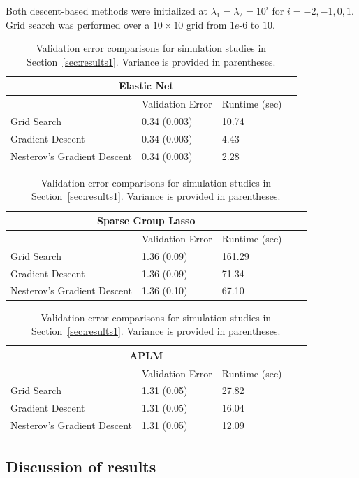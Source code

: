 \documentclass[12pt,letterpaper]{article}
\begin{document}
Both descent-based methods were initialized at $\lambda_1 = \lambda_2 = 10^i$ for $i=-2, -1, 0, 1$. Grid search was performed over a $10 \times 10$ grid from $1e\text{-}6$ to $10$.


\begin{table} 
\begin{center}

\begin{tabular}{| l | l | l | l | }
\hline
\multicolumn{3}{|c|}{Elastic Net}\\
\hline
 & Validation Error & Runtime (sec) \\
\hline
Grid Search & 0.34 (0.003) & 10.74\\
\hline
Gradient Descent & 0.34 (0.003) & 4.43 \\
\hline
Nesterov's Gradient Descent & 0.34 (0.003) & 2.28 \\
\hline
\end{tabular}


\begin{tabular}{| l | l | l | l | l | }
\hline
\multicolumn{3}{|c|}{Sparse Group Lasso}\\
\hline
 & Validation Error & Runtime (sec) \\
\hline
Grid Search & 1.36 (0.09) & 161.29 \\
\hline
Gradient Descent  & 1.36 (0.09) & 71.34 \\
\hline
Nesterov's Gradient Descent  & 1.36 (0.10) & 67.10 \\
\hline
\end{tabular}

\begin{tabular}{| l | l | l | l | l | }
\hline
\multicolumn{3}{|c|}{APLM}\\
\hline
 & Validation Error & Runtime (sec) \\
\hline
Grid Search  & 1.31 (0.05) & 27.82 \\
\hline
Gradient Descent  & 1.31 (0.05) & 16.04 \\
\hline
Nesterov's Gradient Descent  & 1.31 (0.05) & 12.09 \\
\hline
\end{tabular}

\end{center}
\caption {Validation error comparisons for simulation studies in Section~\ref{sec:results1}. Variance is provided in parentheses.}
\label{table:validation}
\end{table}

\subsection{Discussion of results}
\end{document}
